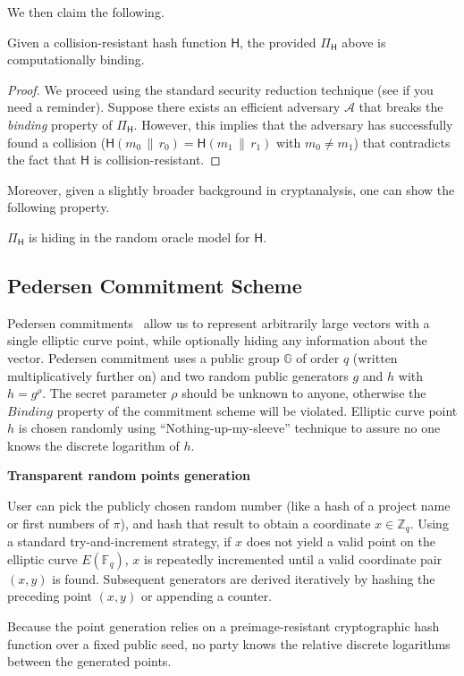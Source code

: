 \documentclass[../../book]{subfiles}
\begin{document}
We then claim the following.

\begin{lemma}
    Given a collision-resistant hash function $\mathsf{H}$, the provided $\Pi_{\mathsf{H}}$ above is computationally binding.
\end{lemma}

\begin{proof}
    We proceed using the standard security reduction technique (see  if you need a reminder).
    Suppose there exists an efficient adversary $\mathcal{A}$ that breaks the \emph{binding} property of $\Pi_{\mathsf{H}}$.
    However, this implies that the adversary has successfully found a collision ($\mathsf{H}(m_0\,\|\, r_0) = \mathsf{H}(m_1\,\|\, r_1)$ with $m_0 \neq m_1$) that contradicts the fact that $\mathsf{H}$ is collision-resistant.
\end{proof}

Moreover, given a slightly broader background in cryptanalysis, one can show the following property.
\begin{lemma}
    $\Pi_{\mathsf{H}}$ is hiding in the random oracle model for $\mathsf{H}$.
\end{lemma}

\subsection{Pedersen Commitment Scheme}

Pedersen commitments~\cite{C:Pedersen91} allow us to represent arbitrarily large vectors with a single elliptic curve point, while optionally hiding any information about the vector. Pedersen commitment uses a public group $\mathbb{G}$ of order $q$ (written multiplicatively further on) and two random public generators $g$ and $h$ with $h=g^{\rho}$. The secret parameter $\rho$ should be unknown to anyone, otherwise the $\textit{Binding}$ property of the commitment scheme will be violated.
Elliptic curve point $h$ is chosen randomly using ``Nothing-up-my-sleeve'' technique to assure no one knows the discrete logarithm of $h$.

\begin{remark}
    \textbf{Transparent random points generation}

    User can pick the publicly chosen random number (like a hash of a project name or first numbers of $\pi$), and hash that result to obtain a coordinate $x \in \mathbb{Z}_q$. Using a standard try-and-increment strategy, if $x$ does not yield a valid point on the elliptic curve $E(\mathbb{F}_q)$, $x$ is repeatedly incremented until a valid coordinate pair $(x, y)$ is found. Subsequent generators are derived iteratively by hashing the preceding point $(x, y)$ or appending a counter.

    Because the point generation relies on a preimage-resistant cryptographic hash function over a fixed public seed, no party knows the relative discrete logarithms between the generated points.
\end{remark}
\end{document}
